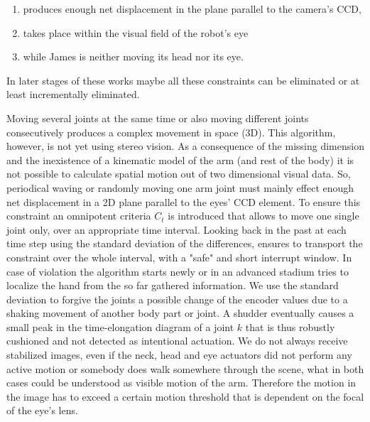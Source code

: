 \begin{enumerate}
	\item produces enough net displacement in the plane parallel to the camera's CCD,
	\item takes place within the visual field of the robot's eye
	\item while James is neither moving its head nor its eye.
\end{enumerate}
In later stages of these works maybe all these constraints can be eliminated or at least incrementally eliminated.

Moving several joints at the same time or also moving different joints consecutively produces a complex movement in space (3D). This algorithm, however, is not yet using stereo vision. As a consequence of the missing dimension and the inexistence of a kinematic model of the arm (and rest of the body) it is not possible to calculate spatial motion out of two dimensional visual data. So, periodical waving or randomly moving one arm joint must mainly effect enough net displacement in a 2D plane parallel to the eyes' CCD element. 
To ensure this constraint an omnipotent criteria $ C_t $ is introduced that allows to move one single joint only, over an appropriate time interval. Looking back in the past at each time step using the standard deviation of the differences, ensures to transport the constraint over the whole interval, with a "safe" and short interrupt window.  In case of violation the algorithm starts newly or in an advanced stadium tries to localize the hand from the so far gathered information. We use the standard deviation to forgive the joints a possible change of the encoder values due to a shaking movement of another body part or joint. A shudder eventually causes a small peak in the time-elongation diagram of a joint $k$ that is thus robustly cushioned and not detected as intentional actuation.
%
We do not always receive stabilized images, even if the neck, head and eye actuators did not perform any active motion or somebody does walk somewhere through the scene, what in both cases could be understood as visible motion of the arm. Therefore the motion in the image has to exceed a certain motion threshold that is dependent on the focal of the eye's lens.
%
%
%

